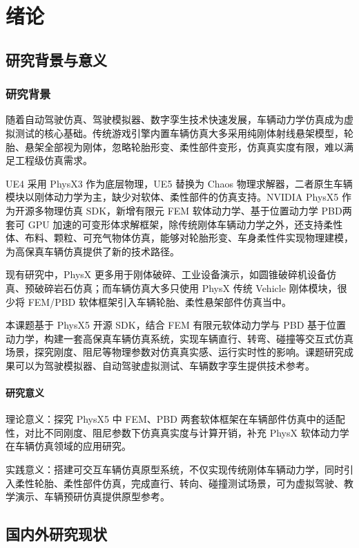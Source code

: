 \chapter{绪论}
\section{研究背景与意义}
\subsection{研究背景}
随着自动驾驶仿真、驾驶模拟器、数字孪生技术快速发展，车辆动力学仿真成为虚拟测试的核心基础。传统游戏引擎内置车辆仿真大多采用纯刚体射线悬架模型，轮胎、悬架全部视为刚体，忽略轮胎形变、柔性部件变形，仿真真实度有限，难以满足工程级仿真需求。

UE4 采用 PhysX3 作为底层物理，UE5 替换为 Chaos 物理求解器，二者原生车辆模块以刚体动力学为主，缺少对软体、柔性部件的仿真支持。NVIDIA PhysX5 作为开源多物理仿真 SDK，新增有限元 FEM 软体动力学、基于位置动力学 PBD两套可 GPU 加速的可变形体求解框架，除传统刚体车辆动力学之外，还支持柔性体、布料、颗粒、可充气物体仿真，能够对轮胎形变、车身柔性件实现物理建模，为高保真车辆仿真提供了新的技术路径\cite{nvidia2020physx5}。

现有研究中，PhysX 更多用于刚体破碎、工业设备演示，如圆锥破碎机设备仿真、预破碎岩石仿真；而车辆仿真大多只使用 PhysX 传统 Vehicle 刚体模块，很少将 FEM/PBD 软体框架引入车辆轮胎、柔性悬架部件仿真当中。

本课题基于 PhysX5 开源 SDK，结合 FEM 有限元软体动力学与 PBD 基于位置动力学，构建一套高保真车辆仿真系统，实现车辆直行、转弯、碰撞等交互式仿真场景，探究刚度、阻尼等物理参数对仿真真实感、运行实时性的影响。课题研究成果可以为驾驶模拟器、自动驾驶虚拟测试、车辆数字孪生提供技术参考。

\subsubsection{研究意义}
理论意义：探究 PhysX5 中 FEM、PBD 两套软体框架在车辆部件仿真中的适配性，对比不同刚度、阻尼参数下仿真真实度与计算开销，补充 PhysX 软体动力学在车辆仿真领域的应用研究\cite{macklin2017pbd}。

实践意义：搭建可交互车辆仿真原型系统，不仅实现传统刚体车辆动力学，同时引入柔性轮胎、柔性部件仿真，完成直行、转向、碰撞测试场景，可为虚拟驾驶、教学演示、车辆预研仿真提供原型参考。

\section{国内外研究现状}
